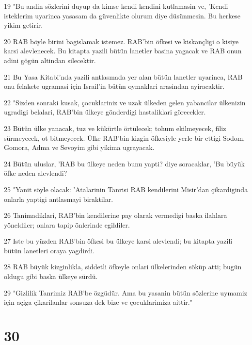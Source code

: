 \par 19 "Bu andin sözlerini duyup da kimse kendi kendini kutlamasin ve, 'Kendi isteklerim uyarinca yasasam da güvenlikte olurum diye düsünmesin. Bu herkese yikim getirir.
\par 20 RAB böyle birini bagislamak istemez. RAB'bin öfkesi ve kiskançligi o kisiye karsi alevlenecek. Bu kitapta yazili bütün lanetler basina yagacak ve RAB onun adini gögün altindan silecektir.
\par 21 Bu Yasa Kitabi'nda yazili antlasmada yer alan bütün lanetler uyarinca, RAB onu felakete ugramasi için Israil'in bütün oymaklari arasindan ayiracaktir.
\par 22 "Sizden sonraki kusak, çocuklariniz ve uzak ülkeden gelen yabancilar ülkenizin ugradigi belalari, RAB'bin ülkeye gönderdigi hastaliklari görecekler.
\par 23 Bütün ülke yanacak, tuz ve kükürtle örtülecek; tohum ekilmeyecek, filiz sürmeyecek, ot bitmeyecek. Ülke RAB'bin kizgin öfkesiyle yerle bir ettigi Sodom, Gomora, Adma ve Sevoyim gibi yikima ugrayacak.
\par 24 Bütün uluslar, 'RAB bu ülkeye neden bunu yapti? diye soracaklar, 'Bu büyük öfke neden alevlendi?
\par 25 "Yanit söyle olacak: 'Atalarinin Tanrisi RAB kendilerini Misir'dan çikardiginda onlarla yaptigi antlasmayi biraktilar.
\par 26 Tanimadiklari, RAB'bin kendilerine pay olarak vermedigi baska ilahlara yöneldiler; onlara tapip önlerinde egildiler.
\par 27 Iste bu yüzden RAB'bin öfkesi bu ülkeye karsi alevlendi; bu kitapta yazili bütün lanetleri oraya yagdirdi.
\par 28 RAB büyük kizginlikla, siddetli öfkeyle onlari ülkelerinden söküp atti; bugün oldugu gibi baska ülkeye sürdü.
\par 29 "Gizlilik Tanrimiz RAB'be özgüdür. Ama bu yasanin bütün sözlerine uymamiz için açiga çikarilanlar sonsuza dek bize ve çocuklarimiza aittir."

\chapter{30}

